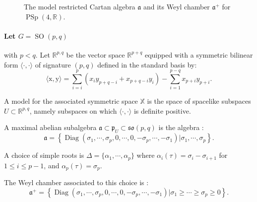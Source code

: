 \documentclass[reqno,10pt]{amsart}
\theoremstyle{plain}
\theoremstyle{definition}
\theoremstyle{remark}
\newcommand{\type}{\tau}
\newcommand{\R}{\mathbb{R}}
\newcommand{\Sph}{\mathbb{S}}
\DeclareMathOperator{\SO}{SO}
\DeclareMathOperator{\PSp}{PSp}
\DeclareMathOperator{\Diag}{Diag}
\newcommand{\X}{\mathbb{X}}
\newcommand{\ie}{namely }
\begin{document}
\begin{figure}[h]%
\begin{center}
\end{center}

\caption{The model restricted Cartan algebra $\mathfrak{a}$ and its Weyl chamber $\mathfrak{a}^+$ for $\PSp(4,\R)$.}
\label{fig:WeylSp4}
\end{figure}

\paragraph*{Let $G=\SO(p,q)$} with $p< q$. Let $\R^{p,q}$ be the vector space $\R^{p+q}$ equipped with a symmetric bilinear form $\langle\cdot,\cdot \rangle$ of signature $(p,q)$ defined in the standard basis by:
$$\langle\mathrm{x},\mathrm{y}\rangle=\sum_{i=i}^p \left(x_iy_{p+q-i}+x_{p+q-i}y_i\right)-\sum_{i=1}^{p-q}x_{p+i}y_{p+i}.$$

 A model for the associated symmetric space $\X$ is the space of spacelike subspaces $U\subset \R^{p,q}$, \ie subspaces on which $\langle\cdot,\cdot \rangle$ is definite positive.


A maximal abelian subalgebra $\mathfrak{a}\subset \mathfrak{p}_U\subset \mathfrak{so}(p,q)$ is the algebra :
$$\mathfrak{a}=\left\lbrace\Diag(\sigma_1,\cdots,\sigma_p,0,\cdots,0, -\sigma_p, \cdots, -\sigma_1)|\sigma_1,\cdots,\sigma_p\right\rbrace.$$

A choice of simple roots is $\Delta=\lbrace\alpha_1,\cdots,\alpha_{p}\rbrace$ where $\alpha_i(\type)=\sigma_i-\sigma_{i+1}$ for $1\leq i\leq p-1$, and $\alpha_p(\type)=\sigma_p$.

The Weyl chamber associated to this choice is :
$$\mathfrak{a}^+=\left\lbrace\Diag(\sigma_1,\cdots,\sigma_p,0,\cdots,0, -\sigma_p, \cdots, -\sigma_1)|\sigma_1\geq \cdots\geq \sigma_p\geq 0\right\rbrace.$$
\end{document}

